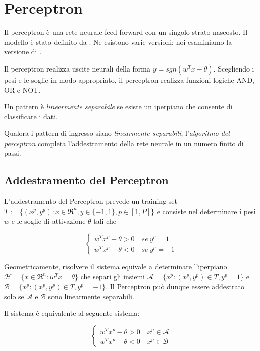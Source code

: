 \chapter{Perceptron}
\label{chp:perceptron}
Il perceptron è una rete neurale feed-forward con un singolo strato nascosto. Il modello è stato definito da \cite{rosenblatt1958perceptron}. Ne esistono varie versioni: noi esaminiamo la versione di \cite{mcculloch1943logical}.

Il perceptron realizza uscite neurali della forma $y=sgn(w^{T}x-\theta)$.
Scegliendo i pesi e le soglie in modo appropriato, il perceptron realizza funzioni logiche AND, OR e NOT.

Un pattern è \textit{linearmente separabile} se esiste un iperpiano che consente di classificare i dati.

Qualora i pattern di ingresso siano \textit{linearmente separabili}, l'\textit{algoritmo del perceptron} completa l'addestramento della rete neurale in un numero finito di passi.


\section{Addestramento del Perceptron}
\label{sec:perceptron.learning}
L'addestramento del Perceptron prevede un training-set
$T:=\{(x^{p},y^{p}):x\in \Re^{n},y\in\{-1,1\},p\in[1,P]\}$
e consiste nel determinare i pesi $w$ e le soglie di attivazione $\theta$ tali che

\begin{equation}
  \label{eqn:perceptron.learning}
  \begin{cases}
    w^{T}x^{p}-\theta>0\quad se\ y^{p}=1 \\
    w^{T}x^{p}-\theta<0\quad se\ y^{p}=-1
  \end{cases}
\end{equation}

Geometricamente, risolvere il sistema  equivale a determinare l'iperpiano $\mathcal{H}=\{x\in\Re^{n}:w^{T}x=\theta\}$ che separi gli insiemi $\mathcal{A}=\{x^{p}:(x^{p},y^{p})\in T, y^{p}=1\}$ e $\mathcal{B}=\{x^{p}:(x^{p},y^{p})\in T, y^{p}=-1\}$.
Il Perceptron può dunque essere addestrato solo se $\mathcal{A}$ e $\mathcal{B}$ sono linearmente separabili.

Il sistema  è equivalente al seguente sistema:

\begin{equation}
  \label{eqn:perceptron.learning.equivalent}
  \begin{cases}
    w^{T}x^{p}-\theta>0\quad x^{p}\in\mathcal{A} \\
    w^{T}x^{p}-\theta<0\quad x^{p}\in\mathcal{B}
  \end{cases}
\end{equation}

